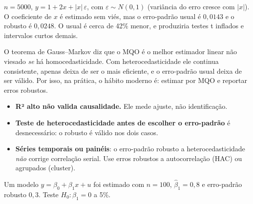 \begin{simulacao}
$n=5000$, $y=1+2x+|x|\,\varepsilon$, com $\varepsilon\sim N(0,1)$ (variância do erro cresce com $|x|$). O coeficiente de $x$ é estimado sem viés, mas o erro-padrão usual é $0{,}0143$ e o robusto é $0{,}0248$. O usual é cerca de 42\% menor, e produziria testes t inflados e intervalos curtos demais.
\end{simulacao}

\begin{intuicao}
O teorema de Gauss--Markov diz que o MQO é o melhor estimador linear não viesado \emph{se} há homocedasticidade. Com heterocedasticidade ele continua consistente, apenas deixa de ser o mais eficiente, e o erro-padrão usual deixa de ser válido. Por isso, na prática, o hábito moderno é: estimar por MQO e reportar erros robustos.
\end{intuicao}

\begin{atencao}
\begin{itemize}[leftmargin=1.2em]
\item \textbf{R² alto não valida causalidade.} Ele mede ajuste, não identificação.
\item \textbf{Teste de heterocedasticidade antes de escolher o erro-padrão} é desnecessário: o robusto é válido nos dois casos.
\item \textbf{Séries temporais ou painéis}: o erro-padrão robusto a heterocedasticidade \emph{não} corrige correlação serial. Use erros robustos a autocorrelação (HAC) ou agrupados (cluster).
\end{itemize}
\end{atencao}

\begin{exercicio}
Um modelo $y=\beta_0+\beta_1 x+u$ foi estimado com $n=100$, $\hat\beta_1=0{,}8$ e erro-padrão robusto $0{,}3$. Teste $H_0:\beta_1=0$ a 5\%.
\end{exercicio}
